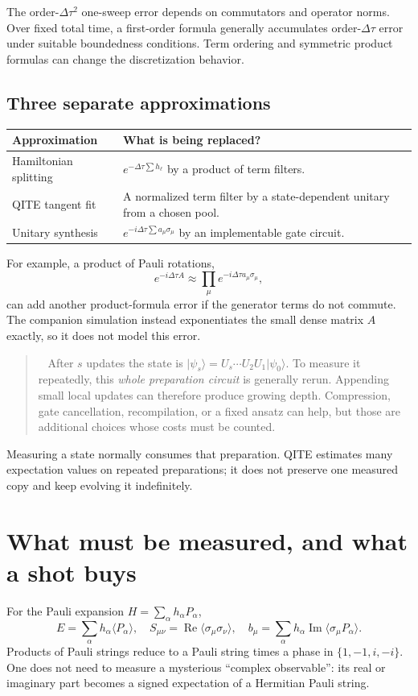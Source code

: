 \documentclass[11pt,a4paper]{article}
\newcommand{\ket}[1]{\lvert #1\rangle}
\newcommand{\ex}[1]{\langle #1\rangle}
\newcommand{\Rea}{\operatorname{Re}}
\newcommand{\Ima}{\operatorname{Im}}
\newcommand{\dt}{\Delta\tau}
\newcommand{\lesson}[2]{\clearpage\section{#1}\label{#2}}
\newenvironment{caution}[1][Important distinction]{\par\smallskip\begin{quotation}\noindent{\bfseries\textcolor{alertred}{#1.}}\ }{\end{quotation}\smallskip}
\begin{document}
The order-$\dt^2$ one-sweep error depends on commutators and operator norms. Over fixed total time, a first-order formula generally accumulates order-$\dt$ error under suitable boundedness conditions. Term ordering and symmetric product formulas can change the discretization behavior.

\subsection*{Three separate approximations}
\begin{tabularx}{\linewidth}{@{}p{3.1cm}X@{}}
\toprule
Approximation & What is being replaced?\\\midrule
Hamiltonian splitting & $e^{-\dt\sum h_\ell}$ by a product of term filters.\\
QITE tangent fit & A normalized term filter by a state-dependent unitary from a chosen pool.\\
Unitary synthesis & $e^{-i\dt\sum a_\mu\sigma_\mu}$ by an implementable gate circuit.\\\bottomrule
\end{tabularx}

For example, a product of Pauli rotations,
\[
e^{-i\dt A}\approx\prod_\mu e^{-i\dt a_\mu\sigma_\mu},
\]
can add another product-formula error if the generator terms do not commute. The companion simulation instead exponentiates the small dense matrix $A$ exactly, so it does not model this error.

\begin{caution}[Local updates do not guarantee shallow prepared states]
After $s$ updates the state is $\ket{\psi_s}=U_s\cdots U_2U_1\ket{\psi_0}$. To measure it repeatedly, this \emph{whole preparation circuit} is generally rerun. Appending small local updates can therefore produce growing depth. Compression, gate cancellation, recompilation, or a fixed ansatz can help, but those are additional choices whose costs must be counted.
\end{caution}

Measuring a state normally consumes that preparation. QITE estimates many expectation values on repeated preparations; it does not preserve one measured copy and keep evolving it indefinitely.

\lesson{What must be measured, and what a shot buys}{sec:measurements}
For the Pauli expansion $H=\sum_\alpha h_\alpha P_\alpha$,
\[
E=\sum_\alpha h_\alpha\ex{P_\alpha},\quad
S_{\mu\nu}=\Rea\ex{\sigma_\mu\sigma_\nu},\quad
b_\mu=\sum_\alpha h_\alpha\Ima\ex{\sigma_\mu P_\alpha}.
\]
Products of Pauli strings reduce to a Pauli string times a phase in $\{1,-1,i,-i\}$. One does not need to measure a mysterious ``complex observable'': its real or imaginary part becomes a signed expectation of a Hermitian Pauli string.
\end{document}
